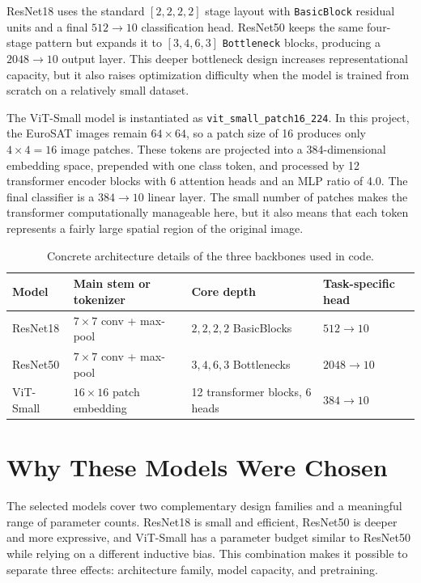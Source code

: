 \documentclass[11pt]{report}
\begin{document}
ResNet18 uses the standard \([2,2,2,2]\) stage layout with \texttt{BasicBlock} residual units and a final \(512 \rightarrow 10\) classification head. ResNet50 keeps the same four-stage pattern but expands it to \([3,4,6,3]\) \texttt{Bottleneck} blocks, producing a \(2048 \rightarrow 10\) output layer. This deeper bottleneck design increases representational capacity, but it also raises optimization difficulty when the model is trained from scratch on a relatively small dataset.

The ViT-Small model is instantiated as \texttt{vit\_small\_patch16\_224}. In this project, the EuroSAT images remain \(64 \times 64\), so a patch size of 16 produces only \(4 \times 4 = 16\) image patches. These tokens are projected into a 384-dimensional embedding space, prepended with one class token, and processed by 12 transformer encoder blocks with 6 attention heads and an MLP ratio of 4.0. The final classifier is a \(384 \rightarrow 10\) linear layer. The small number of patches makes the transformer computationally manageable here, but it also means that each token represents a fairly large spatial region of the original image.

\begin{table}[h]
    \centering
    \caption{Concrete architecture details of the three backbones used in code.}
    \begin{tabular}{l l l l}
        \toprule
        Model & Main stem or tokenizer & Core depth & Task-specific head \\
        \midrule
        ResNet18 & \(7 \times 7\) conv + max-pool & \(2,2,2,2\) BasicBlocks & \(512 \rightarrow 10\) \\
        ResNet50 & \(7 \times 7\) conv + max-pool & \(3,4,6,3\) Bottlenecks & \(2048 \rightarrow 10\) \\
        ViT-Small & \(16 \times 16\) patch embedding & 12 transformer blocks, 6 heads & \(384 \rightarrow 10\) \\
        \bottomrule
    \end{tabular}
\end{table}

\section{Why These Models Were Chosen}
The selected models cover two complementary design families and a meaningful range of parameter counts. ResNet18 is small and efficient, ResNet50 is deeper and more expressive, and ViT-Small has a parameter budget similar to ResNet50 while relying on a different inductive bias. This combination makes it possible to separate three effects: architecture family, model capacity, and pretraining.
\end{document}
